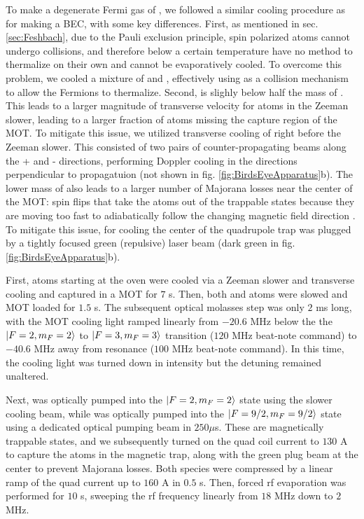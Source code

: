 To make a degenerate Fermi gas of \K{}, we followed a similar cooling procedure as for making a BEC, with some key differences. First, as mentioned in sec. \ref{sec:Feshbach}, due to the Pauli exclusion principle, spin polarized \K{} atoms cannot undergo \swave collisions, and therefore below a certain temperature have no method to thermalize on their own and cannot be evaporatively cooled. To overcome this problem, we cooled a mixture of \Rb{} and \K{}, effectively using \Rb{} as a collision mechanism to allow the Fermions to thermalize. Second, \K{} is slighly below half the mass of \Rb. This leads to a larger magnitude of transverse velocity for \K{} atoms in the Zeeman slower, leading to a larger fraction of atoms missing the capture region of the MOT. To mitigate this issue, we utilized transverse cooling of \K right before the Zeeman slower. This consisted of two pairs of counter-propagating beams along the \ez{}+\ey{} and \ez{}-\ey{} directions, performing Doppler cooling in the directions perpendicular to propagatuion (not shown in fig. \ref{fig:BirdsEyeApparatus}b). The lower mass of \K{} also leads to a larger number of Majorana losses near the center of the MOT: spin flips that take the atoms out of the trappable states because they are moving too fast to adiabatically follow the changing magnetic field direction \cite{Majorana1932,Sukumar1997, Brink2006}. To mitigate this issue, for cooling \K the center of the quadrupole trap was plugged by a tightly focused green (repulsive) laser beam (dark green in fig. \ref{fig:BirdsEyeApparatus}b).

First, \K{} atoms starting at the oven were cooled via a Zeeman slower and transverse cooling and captured in a MOT for $7$ s. Then, both \K{} and \Rb{} atoms were slowed and MOT loaded for $1.5$ s. The subsequent optical molasses step was only $2$ ms long, with the \Rb{} MOT cooling light ramped linearly from $-20.6$ MHz below the the $\mathinner{|{F=2,m_F=2}\rangle}$ to $\mathinner{|{F=3,m_F=3}\rangle}$ transition ($120$ MHz beat-note command) to $-40.6$ MHz away from resonance ($100$ MHz beat-note command). In this time, the \K{} cooling light was turned down in intensity but the detuning remained unaltered.

Next, \Rb{} was optically pumped into the $\mathinner{|{F=2, m_F=2}\rangle}$ state using the slower cooling beam, while \K{} was optically pumped into the $\mathinner{|{F=9/2,m_F=9/2}\rangle}$ state using a dedicated optical pumping beam in $250 \mu$s. These are magnetically trappable states, and we subsequently turned on the quad coil current to $130$ A to capture the atoms in the magnetic trap, along with the green plug beam at the center to prevent Majorana losses. Both species were compressed by a linear ramp of the quad current up to $160$ A in $0.5$ s. Then, forced rf evaporation was performed for $10$ s, sweeping the rf frequency linearly from $18$ MHz down to $2$ MHz.

